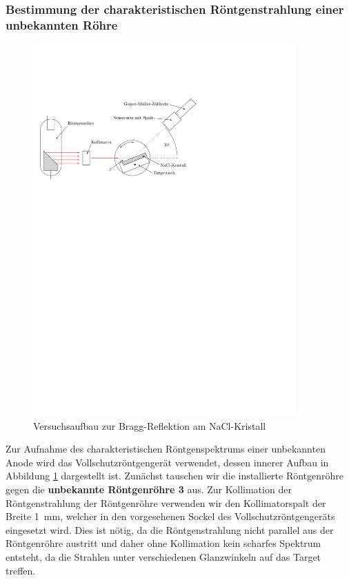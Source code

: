 \documentclass[11pt, a4paper]{article}
\begin{document}
\subsubsection{Bestimmung der charakteristischen Röntgenstrahlung einer unbekannten Röhre}
\begin{figure}[h]
\centering
\includegraphics[width=0.9\textwidth]{./grafiken/aufbau_bragg.pdf}
\caption{Versuchsaufbau zur Bragg-Reflektion am NaCl-Kristall}
\label{fig:bragg_aufbau}
\end{figure}
Zur Aufnahme des charakteristischen Röntgenspektrums einer unbekannten Anode wird das Vollschutzröntgengerät verwendet, dessen innerer Aufbau in Abbildung \ref{fig:bragg_aufbau} dargestellt ist.
Zunächst tauschen wir die installierte Röntgenröhre gegen die \textbf{unbekannte Röntgenröhre 3} aus.
Zur Kollimation der Röntgenstrahlung der Röntgenröhre verwenden wir den Kollimatorspalt der Breite \SI{1}{\milli\metre}, welcher in den vorgesehenen Sockel des Vollschutzröntgengeräts eingesetzt wird.
Dies ist nötig, da die Röntgenstrahlung nicht parallel aus der Röntgenröhre austritt und daher ohne Kollimation kein scharfes Spektrum entsteht, da die Strahlen unter verschiedenen Glanzwinkeln auf das Target treffen.
\end{document}
